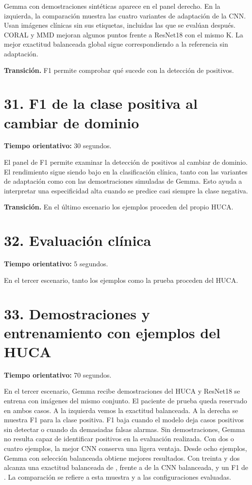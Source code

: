 \documentclass[11pt,a4paper]{article}
\begin{document}
Gemma con demostraciones sintéticas aparece en el panel derecho. En la izquierda, la comparación muestra las cuatro variantes de adaptación de la CNN. Usan imágenes clínicas sin sus etiquetas, incluidas las que se evalúan después. CORAL y MMD mejoran algunos puntos frente a ResNet18 con el mismo K. La mejor exactitud balanceada global sigue correspondiendo a la referencia sin adaptación.

\textbf{Transición.} F1 permite comprobar qué sucede con la detección de positivos.

\section*{31. F1 de la clase positiva al cambiar de dominio}
\textbf{Tiempo orientativo: }30 segundos.

El panel de F1 permite examinar la detección de positivos al cambiar de dominio. El rendimiento sigue siendo bajo en la clasificación clínica, tanto con las variantes de adaptación como con las demostraciones simuladas de Gemma. Esto ayuda a interpretar una especificidad alta cuando se predice casi siempre la clase negativa.

\textbf{Transición.} En el último escenario los ejemplos proceden del propio HUCA.

\section*{32. Evaluación clínica}
\textbf{Tiempo orientativo: }5 segundos.

En el tercer escenario, tanto los ejemplos como la prueba proceden del HUCA.

\section*{33. Demostraciones y entrenamiento con ejemplos del HUCA}
\textbf{Tiempo orientativo: }70 segundos.

En el tercer escenario, Gemma recibe demostraciones del HUCA y ResNet18 se entrena con imágenes del mismo conjunto. El paciente de prueba queda reservado en ambos casos. A la izquierda vemos la exactitud balanceada. A la derecha se muestra F1 para la clase positiva. F1 baja cuando el modelo deja casos positivos sin detectar o cuando da demasiadas falsas alarmas. Sin demostraciones, Gemma no resulta capaz de identificar positivos en la evaluación realizada. Con dos o cuatro ejemplos, la mejor CNN conserva una ligera ventaja. Desde ocho ejemplos, Gemma con selección balanceada obtiene mejores resultados. Con treinta y dos alcanza una exactitud balanceada de \RealVlmBA{}, frente a \RealCnnLastBA{} de la CNN balanceada, y un F1 de \RealVlmFone{}. La comparación se refiere a esta muestra y a las configuraciones evaluadas.
\end{document}
